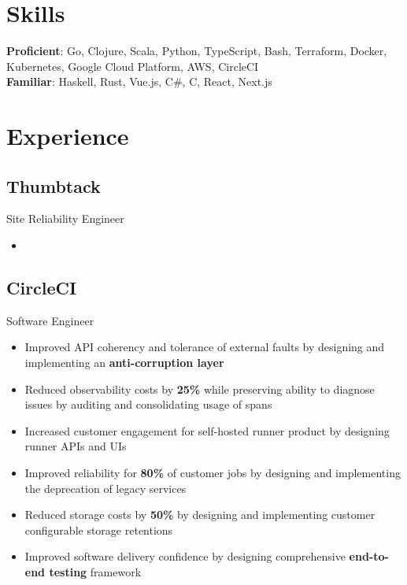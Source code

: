\documentclass[letterpaper,12pt,oneside]{article}
\begin{document}
\section*{Skills}
\textbf{Proficient}:
Go, Clojure, Scala, Python, TypeScript, Bash, Terraform, Docker, Kubernetes,
Google Cloud Platform, AWS, CircleCI \\
\textbf{Familiar}:
Haskell, Rust, Vue.js, C\#, C, React, Next.js

\section*{Experience}
\subsection*{Thumbtack \hfill {}}
Site Reliability Engineer
\begin{itemize}
    \setlength\itemsep{0em}
    \item
\end{itemize}

\subsection*{CircleCI \hfill {}}
Software Engineer
\begin{itemize}
    \setlength\itemsep{0em}
    \item Improved API coherency and tolerance of external faults by designing and implementing an \textbf{anti-corruption layer}
    \item Reduced observability costs by \textbf{25\%} while preserving ability to diagnose issues by auditing and consolidating usage of spans
    \item Increased customer engagement for self-hosted runner product by designing runner APIs and UIs
    \item Improved reliability for \textbf{80\%} of customer jobs by designing and implementing the deprecation of legacy services
    \item Reduced storage costs by \textbf{50\%} by designing and implementing customer configurable storage retentions
    \item Improved software delivery confidence by designing comprehensive \textbf{end-to-end testing} framework
\end{itemize}
\end{document}
